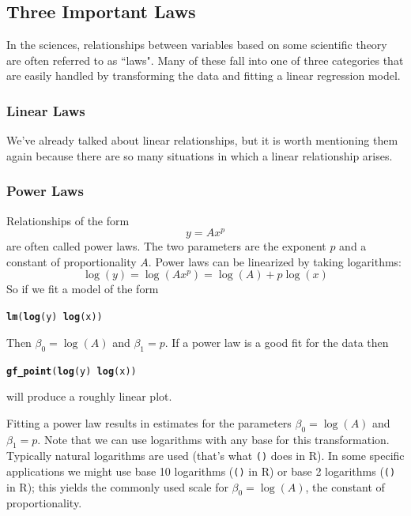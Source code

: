 \documentclass[twoside]{book}\usepackage[]{graphicx}\usepackage[]{xcolor}
\makeatletter
\newcommand{\hlopt}[1]{\textcolor[rgb]{0,0,0}{#1}}%
\newcommand{\hlstd}[1]{\textcolor[rgb]{0.345,0.345,0.345}{#1}}%
\newcommand{\hlkwd}[1]{\textcolor[rgb]{0.737,0.353,0.396}{\textbf{#1}}}%
\newenvironment{kframe}{%
 \def\at@end@of@kframe{}%
 \ifinner\ifhmode%
  \def\at@end@of@kframe{\end{minipage}}%
  \begin{minipage}{\columnwidth}%
 \fi\fi%
 \def\FrameCommand##1{\hskip\@totalleftmargin \hskip-\fboxsep
 \colorbox{shadecolor}{##1}\hskip-\fboxsep
     \hskip-\linewidth \hskip-\@totalleftmargin \hskip\columnwidth}%
 \MakeFramed {\advance\hsize-\width
   \@totalleftmargin\z@ \linewidth\hsize
   \@setminipage}}%
 {\par\unskip\endMakeFramed%
 \at@end@of@kframe}
\newenvironment{knitrout}{}{} %
\newcommand{\Rindex}[1]{\index{\texttt{#1}}}
\newcommand{\function}[1]{{\color{purple!75!blue}\texttt{\StrSubstitute{#1}{()}{}()}}\Rindex{#1}}
\def\R{{\sf R}}
\makeatother
\begin{document}
\subsection{Three Important Laws}
In the sciences, relationships between variables based on some scientific theory
are often referred to as ``laws".  Many of these fall into one of three categories that
are easily handled by transforming the data and fitting a linear regression model.

\subsubsection{Linear Laws}
We've already talked about linear relationships, but it is worth mentioning them again because there
are so many situations in which a linear relationship arises.

\subsubsection{Power Laws}

Relationships of the form 
\[ y = A x^p \]
are often called power laws.  The two parameters are the exponent $p$ and a constant of proportionality $A$.
Power laws can be linearized by taking logarithms:
\[ \log(y) = \log(A x^p) = \log(A) + p \log(x) \]
So if we fit a model of the form
\begin{knitrout}
\color{fgcolor}\begin{kframe}
\begin{alltt}
\hlkwd{lm}\hlstd{(}\hlkwd{log}\hlstd{(y)} \hlopt{~} \hlkwd{log}\hlstd{(x))}
\end{alltt}
\end{kframe}
\end{knitrout}
Then $\beta_0 = \log(A)$ and $\beta_1 = p$.  
If a power law is a good fit for the data then

\begin{knitrout}
\color{fgcolor}\begin{kframe}
\begin{alltt}
\hlkwd{gf_point}\hlstd{(} \hlkwd{log}\hlstd{(y)} \hlopt{~} \hlkwd{log}\hlstd{(x) )}
\end{alltt}
\end{kframe}
\end{knitrout}
will produce a roughly linear plot.

Fitting a power law results in estimates for the parameters $\beta_0 = \log(A)$ and $\beta_1 = p$.
Note that we can use logarithms with any base for this transformation.  Typically natural logarithms are used
(that's what \function{log()} does in \R).  
In some specific applications we might use base 10 logarithms (\function{log10()} in \R) 
or base 2 logarithms (\function{log2()} in \R); 
this yields the commonly used scale for 
$\beta_0 = \log(A)$, the constant of proportionality.
\end{document}
